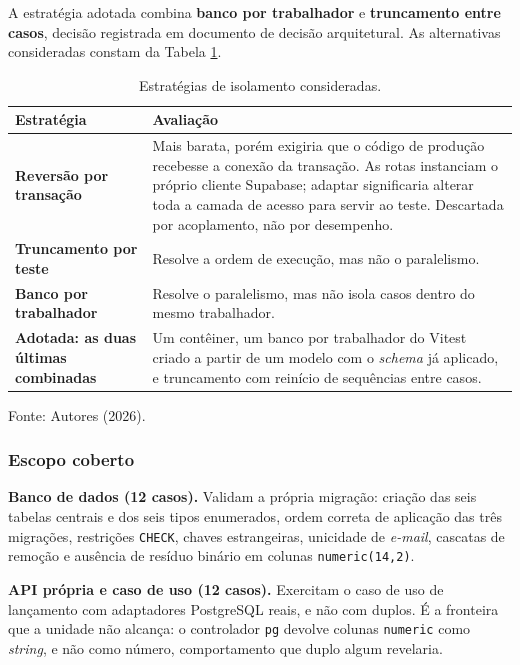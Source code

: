 \documentclass[12pt,a4paper]{article}
\begin{document}
A estratégia adotada combina \textbf{banco por trabalhador} e \textbf{truncamento entre casos}, decisão registrada em documento de decisão arquitetural. As alternativas consideradas constam da Tabela \ref{tab:isolamento}.

\begin{table}[H]
\centering
\caption{Estratégias de isolamento consideradas.}
\label{tab:isolamento}
\renewcommand{\arraystretch}{1.4}
\begin{tabularx}{\textwidth}{@{}>{\bfseries\RaggedRight}p{3.4cm}>{\RaggedRight\arraybackslash}X@{}}
\toprule
\normalfont\textbf{Estratégia} & \textbf{Avaliação} \\
\midrule
Reversão por transação & Mais barata, porém exigiria que o código de produção recebesse a conexão da transação. As rotas instanciam o próprio cliente Supabase; adaptar significaria alterar toda a camada de acesso para servir ao teste. Descartada por acoplamento, não por desempenho. \\
Truncamento por teste & Resolve a ordem de execução, mas não o paralelismo. \\
Banco por trabalhador & Resolve o paralelismo, mas não isola casos dentro do mesmo trabalhador. \\
\textbf{Adotada: as duas últimas combinadas} & Um contêiner, um banco por trabalhador do Vitest criado a partir de um modelo com o \textit{schema} já aplicado, e truncamento com reinício de sequências entre casos. \\
\bottomrule
\end{tabularx}
\vspace{0.3cm}

\noindent\footnotesize Fonte: Autores (2026).
\end{table}

\subsubsection{Escopo coberto}

\textbf{Banco de dados (12 casos).} Validam a própria migração: criação das seis tabelas centrais e dos seis tipos enumerados, ordem correta de aplicação das três migrações, restrições \texttt{CHECK}, chaves estrangeiras, unicidade de \textit{e-mail}, cascatas de remoção e ausência de resíduo binário em colunas \texttt{numeric(14,2)}.

\textbf{API própria e caso de uso (12 casos).} Exercitam o caso de uso de lançamento com adaptadores PostgreSQL reais, e não com duplos. É a fronteira que a unidade não alcança: o controlador \texttt{pg} devolve colunas \texttt{numeric} como \textit{string}, e não como número, comportamento que duplo algum revelaria.
\end{document}

